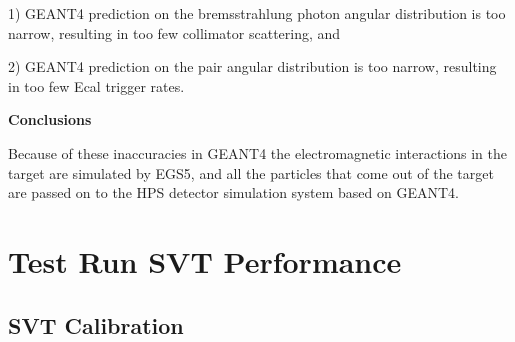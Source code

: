 1) GEANT4 prediction on the bremsstrahlung photon angular distribution is too narrow, 
resulting in too few collimator scattering, and

2) GEANT4 prediction on the pair angular distribution is too narrow, resulting in 
too few Ecal trigger rates.

\vspace{1cm}
\noindent
{\bf Conclusions}

Because of these inaccuracies in GEANT4 the electromagnetic interactions in the target are simulated 
by EGS5, and all the particles that come out of the target are passed on to the HPS detector 
simulation system based on GEANT4.


%

\section{Test Run SVT Performance}
\label{app:svt}
\subsection*{SVT Calibration}



